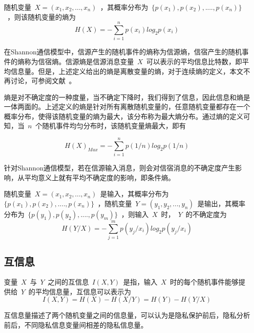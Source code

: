 \begin{definition}
随机变量~$X=(x_1,x_2,...,x_n)$~，其概率分布为~$\{p(x_1),p(x_2),....,p(x_n)\}$~，则该随机变量的熵为
\begin{equation}
H(X)=-\sum_{i=1}^{n}p(x_i)log_2p(x_i)
\end{equation}
\end{definition}
在Shannon通信模型中，信源产生的随机事件的熵称为信源熵，信宿产生的随机事件的熵称为信宿熵。信源熵是信源消息变量~$X$~可以表示的平均信息比特数，即平均信息量。但是，上述定义给出的熵是离散变量的熵，对于连续熵的定义，本文不再讨论，可参阅文献~\cite{stone2018information}。

熵是对不确定度的一种度量，当不确定下降时，我们得到了信息，因此信息和熵是一体两面的。上述定义的熵是针对所有离散随机变量的，任意随机变量都存在一个概率分布，使得该随机变量的熵为最大，该分布称为最大熵分布。通过熵的定义可知，当~$n$~个随机事件均匀分布时，该随机变量熵最大，即有

\begin{equation}
H(X)_{Max}=-\sum_{i=1}^{n}p(1/n)log_2p(1/n)
\end{equation}


针对Shannon通信模型，若在信源输入消息，则会对信宿消息的不确定度产生影响，从平均意义上就有平均不确定度的影响，即条件熵。

\begin{definition}
	随机变量~$X=(x_1,x_2,...,x_n)$~是输入，其概率分布为~$\{p(x_1),p(x_2),....,p(x_n)\}$~，随机变量~$Y=(y_1,y_2,...,y_n)$~是输出，其概率分布为~$\{p(y_1),p(y_2),....,p(y_m)\}$~，则输入~$X$~时，~$Y$~的不确定度为
	\begin{equation}
	H(Y/X)=-\sum_{j=1}^{m}p(y_j/x_i)log_2p(y_j/x_i)
	\end{equation}
\end{definition}


\subsection{互信息}

\begin{definition}
变量~$X$~与~$Y$~之间的互信息~$I(X,Y)$~是指，输入~$X$~时的每个随机事件能够提供给~$Y$~的平均信息量，互信息可以表示为
\begin{equation}
I(X,Y)=H(X)-H(X/Y)=H(Y)-H(Y/X)
\end{equation}
\end{definition}

互信息量描述了两个随机变量之间的信息量，可以认为是隐私保护前后，隐私分析前后，不同隐私信息变量间相差的隐私信息量。


